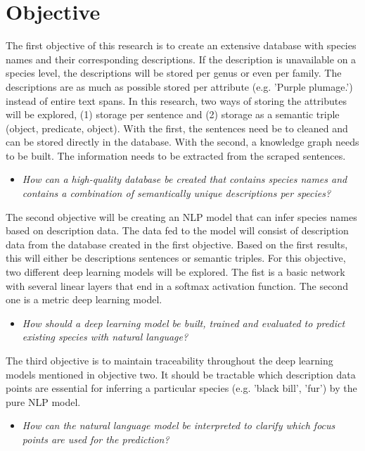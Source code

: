 \documentclass{article}
\begin{document}
\section{Objective}
The first objective of this research is to create an extensive database with species names and their corresponding descriptions. 
If the description is unavailable on a species level, the descriptions will be stored per genus or even per family. 
The descriptions are as much as possible stored per attribute (e.g. 'Purple plumage.') instead of entire text spans.
In this research, two ways of storing the attributes will be explored, (1) storage per sentence and (2) storage as a semantic triple (object, predicate, object).
With the first, the sentences need be to cleaned and can be stored directly in the database.
With the second, a knowledge graph needs to be built.
The information needs to be extracted from the scraped sentences.
\noindent 
\begin{itemize}
    \item \emph{How can a high-quality database be created that contains species names and contains a combination of semantically unique descriptions per species?}
\end{itemize}
The second objective will be creating an NLP model that can infer species names based on description data. 
The data fed to the model will consist of description data from the database created in the first objective. 
Based on the first results, this will either be descriptions sentences or semantic triples.
For this objective, two different deep learning models will be explored.
The fist is a basic network with several linear layers that end in a softmax activation function.
The second one is a metric deep learning model.
\noindent 
\begin{itemize}
    \item \emph{How should a deep learning model be built, trained and evaluated to predict existing species with natural language?}
\end{itemize}
\noindent  
The third objective is to maintain traceability throughout the deep learning models mentioned in objective two.
It should be tractable which description data points are essential for inferring a particular species (e.g. 'black bill', 'fur') by the pure NLP model.
\noindent
\begin{itemize}
    \item \emph{How can the natural language model be interpreted to clarify which focus points are used for the prediction?}
\end{itemize}
\end{document}
